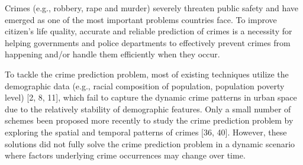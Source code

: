 Crimes (e.g., robbery, rape and murder) severely threaten public
safety and have emerged as one of the most important problems
countries face. To improve citizen’s life quality, accurate and reliable
prediction of crimes is a necessity for helping governments and
police departments to effectively prevent crimes from happening
and/or handle them efficiently when they occur.

\noindent To tackle the crime prediction problem, most of existing techniques utilize the demographic data (e.g., racial composition of
population, population poverty level) [2, 8, 11], which fail to capture the dynamic crime patterns in urban space due to the relatively
stability of demographic features. Only a small number of schemes
been proposed more recently to study the crime prediction problem
by exploring the spatial and temporal patterns of crimes [36, 40].
However, these solutions did not fully solve the crime prediction
problem in a dynamic scenario where factors underlying crime
occurrences may change over time.

